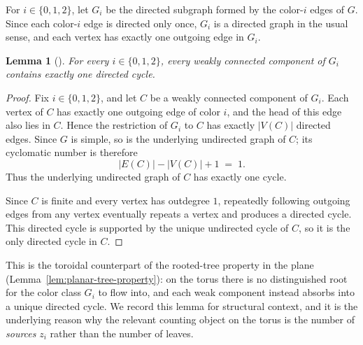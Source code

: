 \documentclass[11pt]{amsart}
\newcommand{\Zthree}{\{0,1,2\}}
\theoremstyle{plain}
\newtheorem{lemma}[theorem]{Lemma}
\theoremstyle{definition}
\theoremstyle{remark}
\begin{document}
For $i \in \Zthree$, let $G_i$ be the directed subgraph formed by the color-$i$ edges of $G$. Since each color-$i$ edge is directed only once, $G_i$ is a directed graph in the usual sense, and each vertex has exactly one outgoing edge in $G_i$.

\begin{lemma}[\cite{goncalves-leveque2014}]
\label{lem:monochromatic-components}
For every $i \in \Zthree$, every weakly connected component of $G_i$ contains exactly one directed cycle.
\end{lemma}

\begin{proof}
Fix $i \in \Zthree$, and let $C$ be a weakly connected component of $G_i$. Each vertex of $C$ has exactly one outgoing edge of color $i$, and the head of this edge also lies in $C$. Hence the restriction of $G_i$ to $C$ has exactly $|V(C)|$ directed edges. Since $G$ is simple, so is the underlying undirected graph of $C$; its cyclomatic number is therefore
\[
  |E(C)| - |V(C)| + 1 \;=\; 1.
\]
Thus the underlying undirected graph of $C$ has exactly one cycle.

Since $C$ is finite and every vertex has outdegree $1$, repeatedly following outgoing edges from any vertex eventually repeats a vertex and produces a directed cycle. This directed cycle is supported by the unique undirected cycle of $C$, so it is the only directed cycle in $C$.
\end{proof}

This is the toroidal counterpart of the rooted-tree property in the plane (Lemma~\ref{lem:planar-tree-property}): on the torus there is no distinguished root for the color class $G_i$ to flow into, and each weak component instead absorbs into a unique directed cycle. We record this lemma for structural context, and it is the underlying reason why the relevant counting object on the torus is the number of \emph{sources} $z_i$ rather than the number of leaves.
\end{document}
